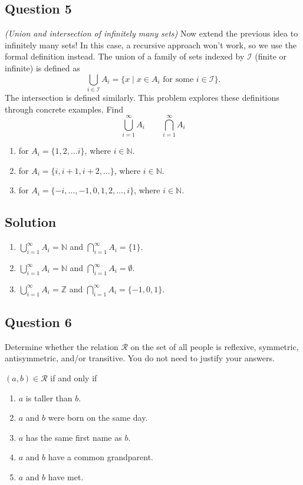 \documentclass{article}
\begin{document}
\subsection*{Question 5}
    \textit{(Union and intersection of infinitely many sets)} Now extend the previous idea to infinitely many sets!  In this case, a recursive approach won't work, so we use the formal definition instead. The union of a family of sets indexed by $\mathcal{I}$ (finite or infinite) is defined as $$\bigcup_{i \in \mathcal{I}} A_{i} = \{x \mid x \in A_{i} \text{ for some } i \in \mathcal{I}\}.$$ The intersection is defined similarly. This problem explores these definitions through concrete examples. Find $$\bigcup_{i = 1}^{\infty} A_{i} \qquad \bigcap_{i = 1}^{\infty} A_{i}$$
    \begin{enumerate}
        \item for $A_{i} = \{1, 2, \dots i\}$, where $i \in \mathbb{N}$.
        \item for $A_{i} = \{i, i + 1, i + 2, \dots\}$, where $i \in \mathbb{N}$.
        \item for $A_{i} = \{-i, \dots, -1, 0, 1, 2, \dots, i\}$, where $i \in \mathbb{N}$.
    \end{enumerate}

\subsection*{Solution}
    \begin{enumerate}
        \item $\bigcup_{i = 1}^{\infty} A_{i} = \mathbb{N}$ and $\bigcap_{i = 1}^{\infty} A_{i} = \{1\}$.
        \item $\bigcup_{i = 1}^{\infty} A_{i} = \mathbb{N}$ and $\bigcap_{i = 1}^{\infty} A_{i} = \emptyset$.
        \item $\bigcup_{i = 1}^{\infty} A_{i} = \mathbb{Z}$ and $\bigcap_{i = 1}^{\infty} A_{i} = \{-1, 0, 1\}$.
    \end{enumerate}

\subsection*{Question 6}
    Determine whether the relation $\mathcal{R}$ on the set of all people is reflexive, symmetric, antisymmetric, and/or transitive. You do not need to justify your answers.
    
    \vspace{3mm} $(a, b) \in \mathcal{R}$ if and only if 
    \begin{enumerate}
        \item $a$ is taller than $b$.
        \item $a$ and $b$ were born on the same day.
        \item $a$ has the same first name as $b$.
        \item $a$ and $b$ have a common grandparent.
        \item $a$ and $b$ have met.
    \end{enumerate}
\end{document}
